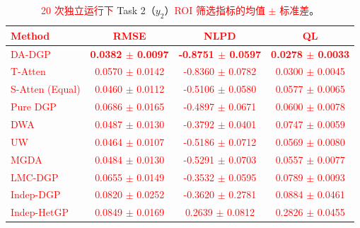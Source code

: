 \documentclass[11pt]{article}
\begin{document}
\begin{table}[htbp]
	\centering
	\small
	\caption{\textcolor{red}{Mean $\pm$ std} of \textcolor{red}{ROI-filtered metrics} for Task 2 ($y_2$) \textcolor{red}{over 20 independent runs}.}
	\caption*{\textcolor{red}{20 次独立运行下} Task 2（$y_2$）\textcolor{red}{ROI 筛选指标的均值 $\pm$ 标准差}。}
	\label{tab:results_task2}
	\begin{tabular*}{\textwidth}{@{\extracolsep{\fill}}lccc}
		\toprule
		\textbf{\textcolor{red}{Method}} & \textbf{\textcolor{red}{RMSE}} & \textbf{\textcolor{red}{NLPD}} & \textbf{\textcolor{red}{QL}} \\
		\midrule
		\textcolor{red}{DA-DGP} & \textcolor{red}{\textbf{0.0382 $\pm$ 0.0097}} & \textcolor{red}{\textbf{-0.8751 $\pm$ 0.0597}} & \textcolor{red}{\textbf{0.0278 $\pm$ 0.0033}} \\
		\textcolor{red}{T-Atten} & \textcolor{red}{0.0570 $\pm$ 0.0142} & \textcolor{red}{-0.8360 $\pm$ 0.0782} & \textcolor{red}{0.0300 $\pm$ 0.0045} \\
		\textcolor{red}{S-Atten (Equal)} & \textcolor{red}{0.0460 $\pm$ 0.0112} & \textcolor{red}{-0.5106 $\pm$ 0.0580} & \textcolor{red}{0.0577 $\pm$ 0.0065} \\
		\textcolor{red}{Pure DGP} & \textcolor{red}{0.0686 $\pm$ 0.0165} & \textcolor{red}{-0.4897 $\pm$ 0.0671} & \textcolor{red}{0.0600 $\pm$ 0.0078} \\
		\textcolor{red}{DWA} & \textcolor{red}{0.0487 $\pm$ 0.0130} & \textcolor{red}{-0.3792 $\pm$ 0.0401} & \textcolor{red}{0.0747 $\pm$ 0.0059} \\
		\textcolor{red}{UW} & \textcolor{red}{0.0464 $\pm$ 0.0107} & \textcolor{red}{-0.5186 $\pm$ 0.0712} & \textcolor{red}{0.0569 $\pm$ 0.0080} \\
		\textcolor{red}{MGDA} & \textcolor{red}{0.0484 $\pm$ 0.0130} & \textcolor{red}{-0.5291 $\pm$ 0.0703} & \textcolor{red}{0.0557 $\pm$ 0.0077} \\
		\textcolor{red}{LMC-DGP} & \textcolor{red}{0.0655 $\pm$ 0.0149} & \textcolor{red}{-0.3532 $\pm$ 0.0595} & \textcolor{red}{0.0789 $\pm$ 0.0093} \\
		\textcolor{red}{Indep-DGP} & \textcolor{red}{0.0820 $\pm$ 0.0252} & \textcolor{red}{-0.3620 $\pm$ 0.2781} & \textcolor{red}{0.0884 $\pm$ 0.0461} \\
		\textcolor{red}{Indep-HetGP} & \textcolor{red}{0.0849 $\pm$ 0.0169} & \textcolor{red}{0.2639 $\pm$ 0.0812} & \textcolor{red}{0.2826 $\pm$ 0.0455} \\
		\bottomrule
	\end{tabular*}
\end{table}
\end{document}
